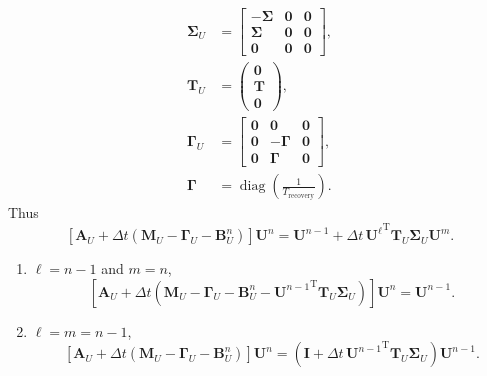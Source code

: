\documentclass{article}
\renewcommand{\vec}[1]{\mathbf{#1}}
\newcommand{\mat}[1]{\mathbf{#1}}
\newcommand{\mT}{\mathrm{T}}
\DeclareMathOperator{\diag}{diag}
\begin{document}
\begin{equation}
\begin{split}
    \mat{\Sigma}_U &=
    \begin{bmatrix}
      - \mat{\Sigma} & \mat{0} & \mat{0}
      \\
      \mat{\Sigma} & \mat{0} & \mat{0}
      \\
      \mat{0} & \mat{0} & \mat{0}
    \end{bmatrix},
    \\
    \mat{T}_U &=
    \begin{pmatrix}
      \vec{0} \\ \vec{T} \\ \vec{0}
    \end{pmatrix},
    \\
    \mat{\Gamma}_U &=
    \begin{bmatrix}
      \mat{0} & \mat{0} & \mat{0}
      \\
      \mat{0} & - \mat{\Gamma} & \mat{0}
      \\
      \mat{0} & \mat{\Gamma} & \mat{0}
    \end{bmatrix},
    \\
    \mat{\Gamma} &= \diag\left(\frac{1}{T_{\text{recovery}}}\right).
  \end{split}
\end{equation}
Thus
\begin{equation}
  \left[\mat{A}_U + \Delta t \left(\mat{M}_U - \mat{\Gamma}_U
    - \mat{B}_U^n\right)\right] \vec{U}^n
  =
  \vec{U}^{n - 1}
  + \Delta t \, {\vec{U}^{\ell}}^{\mT} \vec{T}_U \mat{\Sigma}_U \vec{U}^m.
\end{equation}

\begin{enumerate}
\item $\ell = n - 1$ and $m = n$,
  \begin{equation}
    \left[\mat{A}_U + \Delta t \left(\mat{M}_U - \mat{\Gamma}_U
        - \mat{B}_U^n
        - {\vec{U}^{n-1}}^{\mT} \vec{T}_U \mat{\Sigma}_U\right)\right] \vec{U}^n
    =
    \vec{U}^{n - 1}.
  \end{equation}
\item $\ell = m = n - 1$,
  \begin{equation}
    \left[\mat{A}_U + \Delta t \left(\mat{M}_U - \mat{\Gamma}_U
      - \mat{B}_U^n\right)\right] \vec{U}^n
    =
    \left(\mat{I}
      + \Delta t \, {\vec{U}^{n - 1}}^{\mT} \vec{T}_U \mat{\Sigma}_U\right)
    \vec{U}^{n - 1}.
  \end{equation}
\end{enumerate}





\end{document}
